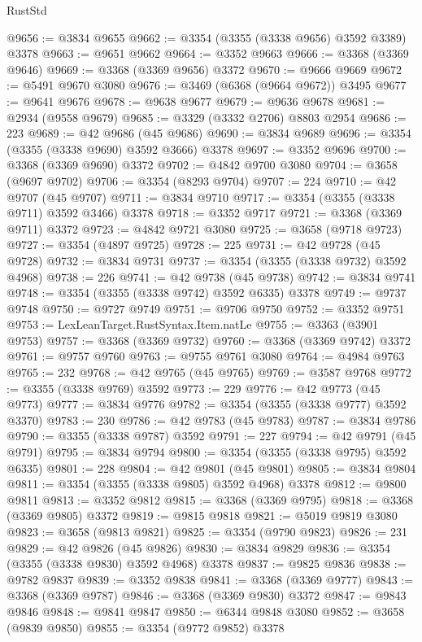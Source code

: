 \begin{lexlean}{RustStd}
\begin{coremodule}
@9656 := @3834 @9655
@9662 := @3354 (@3355 (@3338 @9656) @3592 @3389) @3378
@9663 := @9651 @9662
@9664 := @3352 @9663
@9666 := @3368 (@3369 @9646)
@9669 := @3368 (@3369 @9656) @3372
@9670 := @9666 @9669
@9672 := @5491 @9670 @3080
@9676 := @3469 (@6368 (@9664 @9672)) @3495
@9677 := @9641 @9676
@9678 := @9638 @9677
@9679 := @9636 @9678
@9681 := @2934 (@9558 @9679)
@9685 := @3329 (@3332 @2706) @8803 @2954
@9686 := 223
@9689 := @42 @9686 (@45 @9686)
@9690 := @3834 @9689
@9696 := @3354 (@3355 (@3338 @9690) @3592 @3666) @3378
@9697 := @3352 @9696
@9700 := @3368 (@3369 @9690) @3372
@9702 := @4842 @9700 @3080
@9704 := @3658 (@9697 @9702)
@9706 := @3354 (@8293 @9704)
@9707 := 224
@9710 := @42 @9707 (@45 @9707)
@9711 := @3834 @9710
@9717 := @3354 (@3355 (@3338 @9711) @3592 @3466) @3378
@9718 := @3352 @9717
@9721 := @3368 (@3369 @9711) @3372
@9723 := @4842 @9721 @3080
@9725 := @3658 (@9718 @9723)
@9727 := @3354 (@4897 @9725)
@9728 := 225
@9731 := @42 @9728 (@45 @9728)
@9732 := @3834 @9731
@9737 := @3354 (@3355 (@3338 @9732) @3592 @4968)
@9738 := 226
@9741 := @42 @9738 (@45 @9738)
@9742 := @3834 @9741
@9748 := @3354 (@3355 (@3338 @9742) @3592 @6335) @3378
@9749 := @9737 @9748
@9750 := @9727 @9749
@9751 := @9706 @9750
@9752 := @3352 @9751
@9753 := LexLeanTarget.RustSyntax.Item.natLe
@9755 := @3363 (@3901 @9753)
@9757 := @3368 (@3369 @9732)
@9760 := @3368 (@3369 @9742) @3372
@9761 := @9757 @9760
@9763 := @9755 @9761 @3080
@9764 := @4984 @9763
@9765 := 232
@9768 := @42 @9765 (@45 @9765)
@9769 := @3587 @9768
@9772 := @3355 (@3338 @9769) @3592
@9773 := 229
@9776 := @42 @9773 (@45 @9773)
@9777 := @3834 @9776
@9782 := @3354 (@3355 (@3338 @9777) @3592 @3370)
@9783 := 230
@9786 := @42 @9783 (@45 @9783)
@9787 := @3834 @9786
@9790 := @3355 (@3338 @9787) @3592
@9791 := 227
@9794 := @42 @9791 (@45 @9791)
@9795 := @3834 @9794
@9800 := @3354 (@3355 (@3338 @9795) @3592 @6335)
@9801 := 228
@9804 := @42 @9801 (@45 @9801)
@9805 := @3834 @9804
@9811 := @3354 (@3355 (@3338 @9805) @3592 @4968) @3378
@9812 := @9800 @9811
@9813 := @3352 @9812
@9815 := @3368 (@3369 @9795)
@9818 := @3368 (@3369 @9805) @3372
@9819 := @9815 @9818
@9821 := @5019 @9819 @3080
@9823 := @3658 (@9813 @9821)
@9825 := @3354 (@9790 @9823)
@9826 := 231
@9829 := @42 @9826 (@45 @9826)
@9830 := @3834 @9829
@9836 := @3354 (@3355 (@3338 @9830) @3592 @4968) @3378
@9837 := @9825 @9836
@9838 := @9782 @9837
@9839 := @3352 @9838
@9841 := @3368 (@3369 @9777)
@9843 := @3368 (@3369 @9787)
@9846 := @3368 (@3369 @9830) @3372
@9847 := @9843 @9846
@9848 := @9841 @9847
@9850 := @6344 @9848 @3080
@9852 := @3658 (@9839 @9850)
@9855 := @3354 (@9772 @9852) @3378

\end{coremodule}
\end{lexlean}
